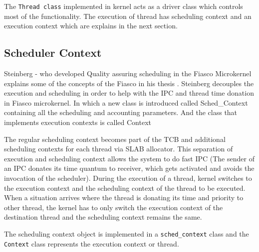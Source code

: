 The \texttt{Thread class} implemented in kernel acts as a driver class which controls most of the functionality. The execution of thread has scheduling context and an execution context which are explains in the next section.


\subsection{Scheduler Context}\label{Foundations:sc}
Steinberg - who developed Quality assuring scheduling in the Fiasco Microkernel explains some of the concepts of the Fiasco in his thesis \cite{stein}. Steinberg decouples the execution and scheduling in order to help with the IPC and thread time donation in Fiasco microkernel. In which a new class is introduced called Sched\_Context containing all the scheduling and accounting parameters. And the class that implements execution contexts is called Context

The regular scheduling context becomes part of the TCB and additional scheduling contexts for each thread via SLAB allocator. This separation of execution and scheduling context allows the system to do fast IPC (The sender of an IPC donates its time quantum to receiver, which gets activated and avoids the invocation of the scheduler). During the execution of a thread, kernel switches to the execution context and the scheduling context of the thread to be executed. When a situation arrives where the thread is donating its time and priority to other thread, the kernel has to only switch the execution context of the destination thread and the scheduling context remains the same.

The scheduling context object is implemented in a \texttt{sched\_context} class and the \texttt{Context} class represents the execution context or thread.


